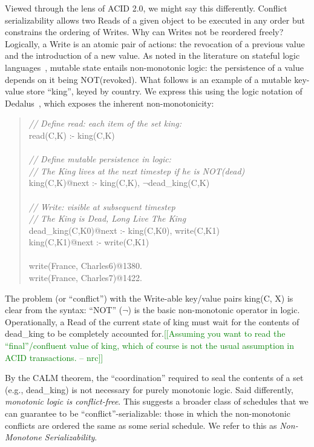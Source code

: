 \documentclass{sig-alternate}
\newcommand{\nrc}[1]{{\textcolor{green}{[[#1 -- nrc]]}}}
\begin{document}
Viewed through the lens of ACID 2.0, we might say this differently.  Conflict
serializability allows two Reads of a given object to be executed in any order
but constrains the ordering of Writes. Why can Writes not be reordered freely?
Logically, a Write is an atomic pair of actions: the revocation of a previous
value and the introduction of a new value.  As noted in the literature on
stateful logic languages~\cite{dedalus,statelog}, mutable state entails
non-monotonic logic: the persistence of a value depends on it being
NOT(revoked). What follows is an example of a mutable key-value store ``king'',
keyed by country.  We express this using the logic notation of
Dedalus~\cite{dedalus}, which exposes the inherent non-monotonicity:
\begin{quote}
	\emph{// Define read: each item of the set king: }\\
	read(C,K) :- king(C,K)\\
	\\
	\emph{// Define mutable persistence in logic:}\\
	\emph{// The King lives at the next timestep if he is NOT(dead)}\\
	king(C,K)@next :- king(C,K), $\neg$dead\_king(C,K)\\
	\\
	\emph{// Write: visible at subsequent timestep}\\
	\emph{// The King is Dead, Long Live The King}\\
	dead\_king(C,K0)@next :- king(C,K0), write(C,K1)\\
	king(C,K1)@next :- write(C,K1)\\
	\\
	write(France, Charles6)@1380.\\
	write(France, Charles7)@1422.
\end{quote}
The problem (or ``conflict'') with the Write-able key/value pairs king(C, X) is
clear from the syntax: ``NOT'' ($\neg$) is the basic non-monotonic operator in
logic.  Operationally, a Read of the current state of king must wait for the
contents of dead\_king to be completely accounted for.\nrc{Assuming you want to
  read the ``final''/confluent value of king, which of course is not the usual
  assumption in ACID transactions.}

By the CALM theorem, the ``coordination'' required to seal the contents of a set
(e.g., dead\_king) is not necessary for purely monotonic logic.  Said
differently, \emph{monotonic logic is conflict-free}.  This suggests a broader
class of schedules that we can guarantee to be ``conflict''-serializable: those
in which the non-monotonic conflicts are ordered the same as some serial
schedule.  We refer to this as \emph{Non-Monotone Serializability}.
\end{document}
